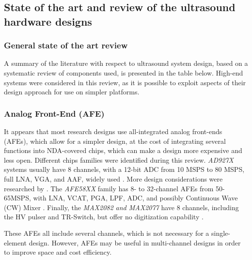 \documentclass{article}
\begin{document}
\subsection{State of the art and review of the ultrasound hardware designs}

\subsubsection{General state of the art review}

A summary of the literature with respect to ultrasound system design, based on a systematic review of components used, is presented in the table below. High-end systems were considered in this review, as it is possible to exploit aspects of their design approach for use on simpler platforms. 



\subsubsection{Analog Front-End (AFE)}

It appears that most research designs use all-integrated analog front-ends (AFEs), which allow for a simpler design, at the cost of integrating several functions into NDA-covered chips, which can make a design more expensive and less open. Different chips families were identified during this review. \emph{AD927X} systems usually have 8 channels, with a 12-bit ADC from 10 MSPS to 80 MSPS, full LNA, VGA, and AAF, widely used \cite{hewener_highly_2012,  di_ianni_system-level_2016, raj_programmable_2018, cheung_multi-channel_2012, alqasemi_fpga-based_2012, batbayar_hardware_2018,  techavipoo_ultrasound_2012}. More design considerations were researched by \cite{di_ianni_system-level_2016}.
The \emph{AFE58XX} family has 8- to 32-channel AFEs from 50-65MSPS, with LNA, VCAT, PGA, LPF, ADC, and possibly Continuous Wave (CW) Mixer \cite{assef_flexible_2015, assef_design_2012, assef_compact_2014, assef_initial_2016, bharath_fpga-based_2015, bharath_novel_2016, lee_new_2014, hager_lightprobe:_2017, bharath_compact_2018, kidav_architecture_2019}. Finally, the \emph{MAX2082 and MAX2077} have 8 channels, including the HV pulser and TR-Switch, but offer no digitization capability \cite{hewener_mobile_2019, weng_fpga-based_2015}. 

These AFEs all include several channels, which is not necessary for a single-element design. However, AFEs may be useful in multi-channel designs in order to improve space and cost efficiency.
\end{document}

